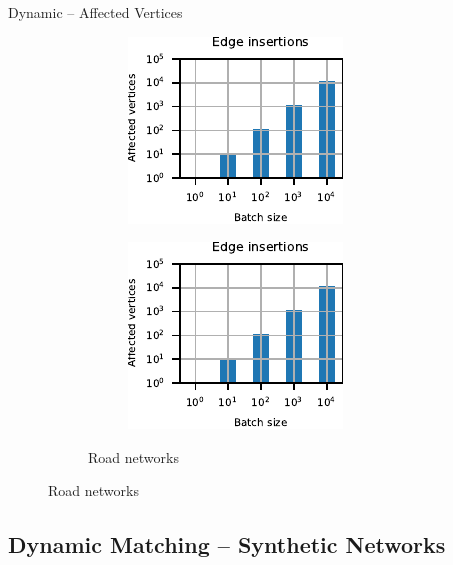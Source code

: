\documentclass[10pt,titlepage,english,presentation]{beamer}
\begin{document}
\begin{frame}{Dynamic \suitor -- Affected Vertices}
\begin{figure}
\begin{subfigure}[t]{\textwidth}
\begin{subfigure}[t]{.5\textwidth}
\centering
\includegraphics[width=.6\textwidth]{../sources/plots/dyn-mwm/affected-road-insertion.pdf}
\end{subfigure}\hfill
\begin{subfigure}[t]{.5\textwidth}
\centering
\includegraphics[width=.6\textwidth]{../sources/plots/dyn-mwm/affected-road-insertion.pdf}
\end{subfigure}
\caption*{\scriptsize Road networks}
\end{subfigure}
\end{figure}
\end{frame}

\subsection{Dynamic Matching -- Synthetic Networks}
\end{document}
